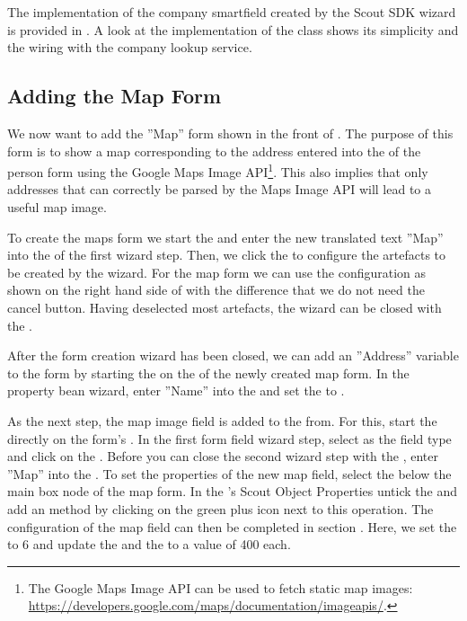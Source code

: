 \documentclass[a4paper,10pt,twoside]{book}
\begin{document}
The implementation of the company smartfield created by the Scout SDK wizard is provided in . 
A look at the implementation of the  class shows its simplicity and the wiring with the company lookup service.

\subsection{Adding the Map Form}

We now want to add the ''Map'' form shown in the front of .
The purpose of this form is to show a map corresponding to the address entered into the  of the person form using the Google Maps Image API\footnote{
The Google Maps Image API can be used to fetch static map images: \url{https://developers.google.com/maps/documentation/imageapis/}.
}.
This also implies that only addresses that can correctly be parsed by the Maps Image API will lead to a useful map image.

To create the maps form we start the  and enter the new translated text ''Map'' into the  of the first wizard step. 
Then, we click the  to configure the artefacts to be created by the wizard. 
For the map form we can use the configuration as shown on the right hand side of  with the difference that we do not need the cancel button.
Having deselected most artefacts, the wizard can be closed with the .

After the form creation wizard has been closed, we can add an ''Address'' variable to the form by starting the  on the  of the newly created map form.
In the property bean wizard, enter ''Name'' into the  and set the  to . 

As the next step, the map image field is added to the from. 
For this, start the  directly on the form's . 
In the first form field wizard step, select  as the field type and click on the . 
Before you can close the second wizard step with the , enter ''Map'' into the . 
To set the properties of the new map field, select the  below the main box node of the map form. 
In the 's Scout Object Properties untick the  and add an  method by clicking on the green plus icon next to this operation. 
The configuration of the map field can then be completed in section . 
Here, we set the  to 6 and update the  and the  to a value of 400 each.
\end{document}
